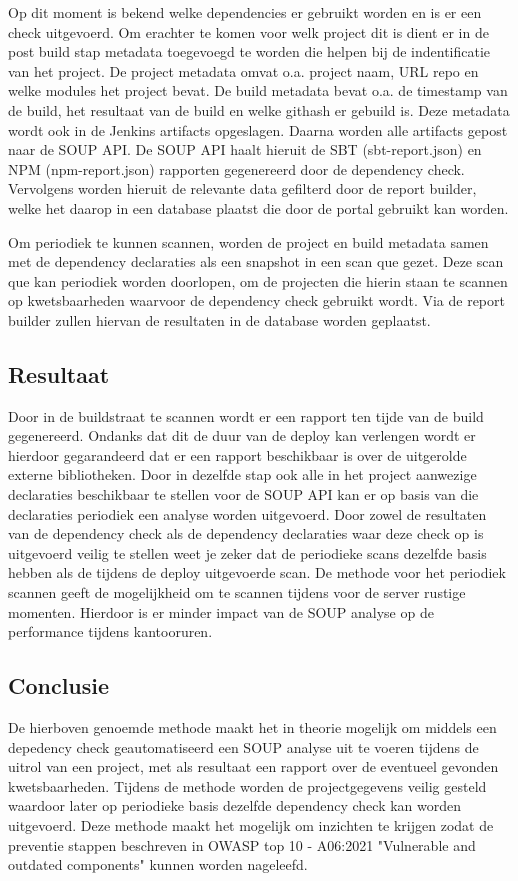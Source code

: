 Op dit moment is bekend welke dependencies er gebruikt worden en is er een check uitgevoerd. Om erachter te komen voor welk project dit is dient er in de post build stap metadata toegevoegd te worden die helpen bij de indentificatie van het project. De project metadata omvat o.a. project naam, URL repo en welke modules het project bevat. De build metadata bevat o.a. de timestamp van de build, het resultaat van de build en welke githash er gebuild is. Deze metadata wordt ook in de Jenkins artifacts opgeslagen. Daarna worden alle artifacts gepost naar de SOUP API.
De SOUP API haalt hieruit de SBT (sbt-report.json) en NPM (npm-report.json) rapporten gegenereerd door de dependency check. Vervolgens worden hieruit de relevante data gefilterd door de report builder, welke het daarop in een database plaatst die door de portal gebruikt kan worden.


Om periodiek te kunnen scannen, worden de project en build metadata samen met de dependency declaraties als een snapshot in een scan que gezet. Deze scan que kan periodiek worden doorlopen, om de projecten die hierin staan te scannen op kwetsbaarheden waarvoor de dependency check gebruikt wordt. Via de report builder zullen hiervan de resultaten in de database worden geplaatst.

\subsection{Resultaat}
Door in de buildstraat te scannen wordt er een rapport ten tijde van de build gegenereerd. Ondanks dat dit de duur van de deploy kan verlengen wordt er hierdoor gegarandeerd dat er een rapport beschikbaar is over de uitgerolde externe bibliotheken. Door in dezelfde stap ook alle in het project aanwezige declaraties beschikbaar te stellen voor de SOUP API kan er op basis van die declaraties periodiek een analyse worden uitgevoerd. Door zowel de resultaten van de dependency check als de dependency declaraties waar deze check op is uitgevoerd veilig te stellen weet je zeker dat de periodieke scans dezelfde basis hebben als de tijdens de deploy uitgevoerde scan. De methode voor het periodiek scannen geeft de mogelijkheid om te scannen tijdens voor de server rustige momenten. Hierdoor is er minder impact van de SOUP analyse op de performance tijdens kantooruren.

\subsection{Conclusie}\label{sec:conclusie}
De hierboven genoemde methode maakt het in theorie mogelijk om middels een depedency check geautomatiseerd een SOUP analyse uit te voeren tijdens de uitrol van een project, met als resultaat een rapport over de eventueel gevonden kwetsbaarheden. Tijdens de methode worden de projectgegevens veilig gesteld waardoor later op periodieke basis dezelfde dependency check kan worden uitgevoerd.
Deze methode maakt het mogelijk om inzichten te krijgen zodat de preventie stappen beschreven in OWASP top 10 - A06:2021 "Vulnerable and outdated components" kunnen worden nageleefd.


